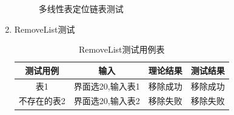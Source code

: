 \documentclass[supercite]{HustGraduPaper}
\theoremstyle{definition}
\begin{document}
\begin{enumerate}
\begin{figure}[htb]
		      \caption{多线性表定位链表测试}
	      \end{figure}
	      \newpage
	\item RemoveList测试
	      \begin{table}[htb]
		      \begin{center}
			      \setlength{\tabcolsep}{2.0mm}
			      \caption{RemoveList测试用例表}
			      \label{table21}
			      \begin{tabular}{|c|c|c|c|}
				      \hline
				      测试用例    & 输入             & 理论结果 & 测试结果 \\
				      \hline
				      \hline
				      表1         & 界面选20,输入表1 & 移除成功 & 移除成功 \\
				      \hline
				      不存在的表2 & 界面选20,输入表2 & 移除失败 & 移除失败 \\
				      \hline
			      \end{tabular}
		      \end{center}
	      \end{table}
	      \begin{figure}[htb]
		      \centering
		      \quad
		      \\

\end{figure}
\end{enumerate}
\end{document}
